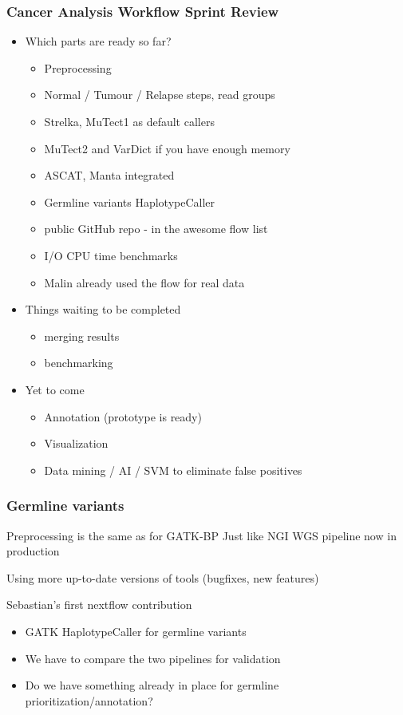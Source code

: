 \documentclass{beamer}
\begin{document}
\begin{frame}
\frametitle{Cancer Analysis Workflow Sprint Review}
\begin{itemize}
	\item Which parts are ready so far?
		\begin{itemize}
			\item Preprocessing
			\item Normal / Tumour / Relapse steps, read groups
			\item Strelka, MuTect1 as default callers
			\item MuTect2 and VarDict if you have enough memory
			\item ASCAT, Manta integrated
			\item Germline variants HaplotypeCaller
			\item public GitHub repo - in the awesome flow list
			\item I/O CPU time benchmarks
			\item Malin already used the flow for real data
		\end{itemize}
	\item Things waiting to be completed
		\begin{itemize}
			\item merging results
			\item benchmarking
		\end{itemize}
	\item Yet to come
		\begin{itemize}
			\item Annotation (prototype is ready)
			\item Visualization
			\item Data mining / AI / SVM to eliminate false positives
		\end{itemize}
\end{itemize}
\end{frame}

\begin{frame}
\frametitle{Germline variants}
	\begin{block}{Preprocessing is the same as for GATK-BP}
	Just like NGI WGS pipeline now in production

	Using more up-to-date versions of tools (bugfixes, new features)

	Sebastian's first nextflow contribution
	\end{block}
	\begin{itemize}
		\item GATK HaplotypeCaller for germline variants
		\item We have to compare the two pipelines for validation
		\item Do we have something already in place for germline prioritization/annotation?
	\end{itemize}
\end{frame}
\end{document}
